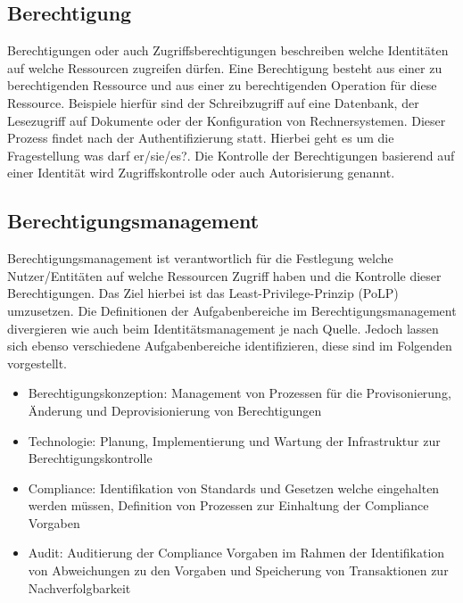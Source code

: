 \documentclass[12pt]{article}
\begin{document}
\subsection{Berechtigung}
Berechtigungen oder auch Zugriffsberechtigungen beschreiben welche Identitäten auf welche Ressourcen zugreifen dürfen. Eine Berechtigung besteht aus einer zu berechtigenden Ressource und aus einer zu berechtigenden Operation für diese Ressource. Beispiele hierfür sind der Schreibzugriff auf eine Datenbank, der Lesezugriff auf Dokumente oder der Konfiguration von Rechnersystemen. Dieser Prozess findet nach der Authentifizierung statt. Hierbei geht es um die Fragestellung \glqq{}was darf er/sie/es?\grqq{}. Die Kontrolle der Berechtigungen basierend auf einer Identität wird Zugriffskontrolle oder auch Autorisierung genannt.~\cite{tsolkas2017}
\subsection{Berechtigungsmanagement}
Berechtigungsmanagement ist verantwortlich für die Festlegung welche Nutzer/Entitäten auf welche Ressourcen Zugriff haben und die Kontrolle dieser Berechtigungen. Das Ziel hierbei ist das Least-Privilege-Prinzip (PoLP) umzusetzen. Die Definitionen der Aufgabenbereiche im Berechtigungsmanagement divergieren wie auch beim Identitätsmanagement je nach Quelle. Jedoch lassen sich ebenso verschiedene Aufgabenbereiche identifizieren, diese sind im Folgenden vorgestellt.
\begin{itemize}
  \item Berechtigungskonzeption: Management von Prozessen für die Provisonierung, Änderung und Deprovisionierung von Berechtigungen~\cite{orp4}~\cite{tsolkas2017}
  \item Technologie: Planung, Implementierung und Wartung der Infrastruktur zur Berechtigungskontrolle~\cite{tsolkas2017}
  \item Compliance: Identifikation von Standards und Gesetzen welche eingehalten werden müssen, Definition von Prozessen zur Einhaltung der Compliance Vorgaben~\cite{conta2017leitfaden}\cite{tsolkas2017}
  \item Audit: Auditierung der Compliance Vorgaben im Rahmen der Identifikation von Abweichungen zu den Vorgaben und Speicherung von Transaktionen zur Nachverfolgbarkeit~\cite{benantar2005access}
\end{itemize}
\end{document}
